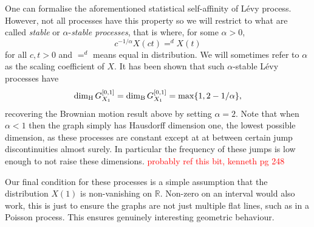 One can formalise the aforementioned statistical self-affinity of L\'evy process. However, not all processes have this property so we will restrict to what are called \textit{stable} or $\alpha$-\textit{stable processes}, that is where, for some $\alpha > 0$,
\[
c^{-1/\alpha}X(ct) =^d X(t)
\]
for all $c,t > 0$ and $=^d$ means equal in distribution. We will sometimes refer to $\alpha$ as the scaling coefficient of $X$. It has been shown that such $\alpha$-stable L\'evy processes have
\[
\dim_\text{H} G_{X_1}^{[0,1]} = \dim_{\textup{B}}  G_{X_1}^{[0,1]} = \max\{1, 2 - 1/\alpha\},
\]
recovering the Brownian motion result above by setting $\alpha = 2$. Note that when $\alpha < 1$ then the graph simply has Hausdorff dimension one, the lowest possible dimension, as these processes are constant except at at between certain jump discontinuities almost surely. In particular the frequency of these jumps is low enough to not raise these dimensions.
\textcolor{red}{probably ref this bit, kenneth pg 248}

Our final condition for these processes is a simple assumption that the distribution $X(1)$ is non-vanishing on $\mathbb{R}$. Non-zero on an interval would also work, this is just to ensure the graphs are not just multiple flat lines, such as in a Poisson process. This ensures genuinely interesting geometric behaviour.


